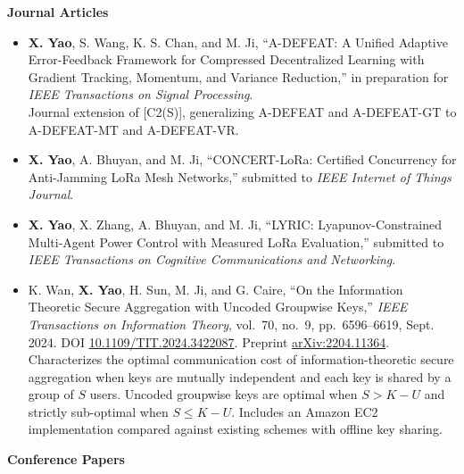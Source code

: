 \documentclass[10pt]{article}
\begin{document}
\textbf{Journal Articles}
\begin{itemize}[leftmargin=3.9em,labelwidth=3.5em,labelsep=0.4em,align=left]
\item[{[J1(P)]}] \textbf{X. Yao}, S. Wang, K. S. Chan, and M. Ji, ``A-DEFEAT: A Unified Adaptive Error-Feedback Framework for Compressed Decentralized Learning with Gradient Tracking, Momentum, and Variance Reduction,'' in preparation for \emph{IEEE Transactions on Signal Processing}.\\
{\small Journal extension of [C2(S)], generalizing A-DEFEAT and A-DEFEAT-GT to A-DEFEAT-MT and A-DEFEAT-VR.}
\item[{[J2(S)]}] \textbf{X. Yao}, A. Bhuyan, and M. Ji, ``CONCERT-LoRa: Certified Concurrency for Anti-Jamming LoRa Mesh Networks,'' submitted to \emph{IEEE Internet of Things Journal}.
\item[{[J3(S)]}] \textbf{X. Yao}, X. Zhang, A. Bhuyan, and M. Ji, ``LYRIC: Lyapunov-Constrained Multi-Agent Power Control with Measured LoRa Evaluation,'' submitted to \emph{IEEE Transactions on Cognitive Communications and Networking}.
\item[{[J4]}] K. Wan, \textbf{X. Yao}, H. Sun, M. Ji, and G. Caire, ``On the Information Theoretic Secure Aggregation with Uncoded Groupwise Keys,'' \emph{IEEE Transactions on Information Theory}, vol.~70, no.~9, pp.~6596--6619, Sept. 2024. DOI \href{https://doi.org/10.1109/TIT.2024.3422087}{10.1109/TIT.2024.3422087}. Preprint \href{https://arxiv.org/abs/2204.11364}{arXiv:2204.11364}.\\
{\small Characterizes the optimal communication cost of information-theoretic secure aggregation when keys are mutually independent and each key is shared by a group of $S$ users. Uncoded groupwise keys are optimal when $S > K-U$ and strictly sub-optimal when $S \le K-U$. Includes an Amazon EC2 implementation compared against existing schemes with offline key sharing.}
\end{itemize}
\textbf{Conference Papers}
\end{document}

